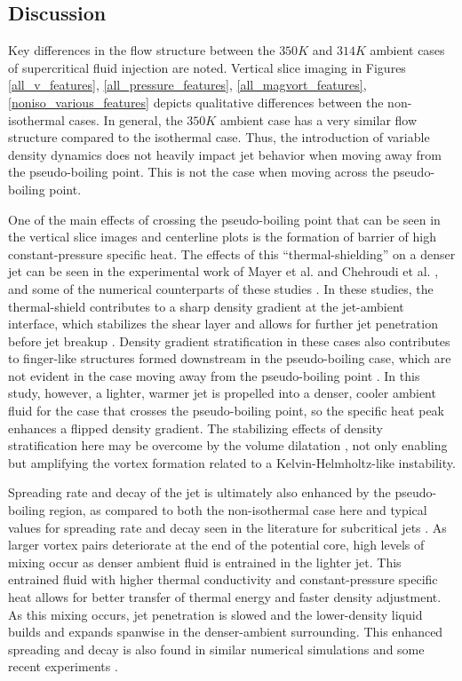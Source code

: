\subsection{Discussion}
Key differences in the flow structure between the $350 K$ and $314 K$ ambient cases of supercritical fluid injection are noted. Vertical slice imaging in Figures \ref{all_v_features}, \ref{all_pressure_features}, \ref{all_magvort_features}, \ref{noniso_various_features} depicts qualitative differences between the non-isothermal cases. In general, the $350 K$ ambient case has a very similar flow structure compared to the isothermal case. Thus, the introduction of variable density dynamics does not heavily impact jet behavior when moving away from the pseudo-boiling point. This is not the case when moving across the pseudo-boiling point. 

One of the main effects of crossing the pseudo-boiling point that can be seen in the vertical slice images and centerline plots is the formation of barrier of high constant-pressure specific heat. The effects of this ``thermal-shielding'' \cite{10.1063/1.5054797} on a denser jet can be seen in the experimental work of Mayer et al. \cite{mayer2003raman} and Chehroudi et al. \cite{chehroudi2002cryogenic}, and some of the numerical counterparts of these studies \cite{10.1063/1.5054797, doi:10.1063/1.1795011}. In these studies, the thermal-shield contributes to a sharp density gradient at the jet-ambient interface, which stabilizes the shear layer and allows for further jet penetration before jet breakup \cite{10.1063/1.5054797}. Density gradient stratification in these cases also contributes to finger-like structures formed downstream in the pseudo-boiling case, which are not evident in the case moving away from the pseudo-boiling point \cite{10.1063/1.5054797}. In this study, however, a lighter, warmer jet is propelled into a denser, cooler ambient fluid for the case that crosses the pseudo-boiling point, so the specific heat peak enhances a flipped density gradient. The stabilizing effects of density stratification here may be overcome by the volume dilatation \cite{Li2012}, not only enabling but amplifying the vortex formation related to a Kelvin-Helmholtz-like instability. 

Spreading rate and decay of the jet is ultimately also enhanced by the pseudo-boiling region, as compared to both the non-isothermal case here and typical values for spreading rate and decay seen in the literature for subcritical jets \cite{iso_comp_1_ref_1}. As larger vortex pairs deteriorate at the end of the potential core, high levels of mixing occur as denser ambient fluid is entrained in the lighter jet. This entrained fluid with higher thermal conductivity and constant-pressure specific heat allows for better transfer of thermal energy and faster density adjustment. As this mixing occurs, jet penetration is slowed and the lower-density liquid builds and expands spanwise in the denser-ambient surrounding. This enhanced spreading and decay is also found in similar numerical simulations \cite{Li2012} and some recent experiments \cite{10.1063/5.0072291}.

